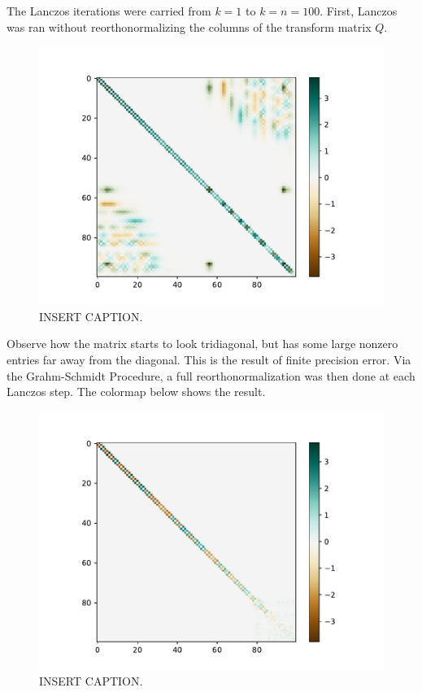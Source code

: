 The Lanczos iterations were carried from $k=1$ to $k=n=100$. First, Lanczos was ran without reorthonormalizing the columns of the transform matrix $Q$.


\begin{figure}[t]
\begin{center}
\includegraphics[width=0.7\columnwidth]{Images/Lanczos/T_noReortho.pdf}
\end{center}
\caption{INSERT CAPTION.}
\label{fig:particle_partition}
\end{figure}

Observe how the matrix starts to look tridiagonal, but has some large nonzero entries far away from the diagonal. This is the result of finite precision error. Via the Grahm-Schmidt Procedure, a full reorthonormalization was then done at each Lanczos step. The colormap below shows the result.

\begin{figure}[t]
\begin{center}
\includegraphics[width=0.7\columnwidth]{Images/Lanczos/T_yesReortho.pdf}
\end{center}
\caption{INSERT CAPTION.}
\label{fig:particle_partition}
\end{figure}

